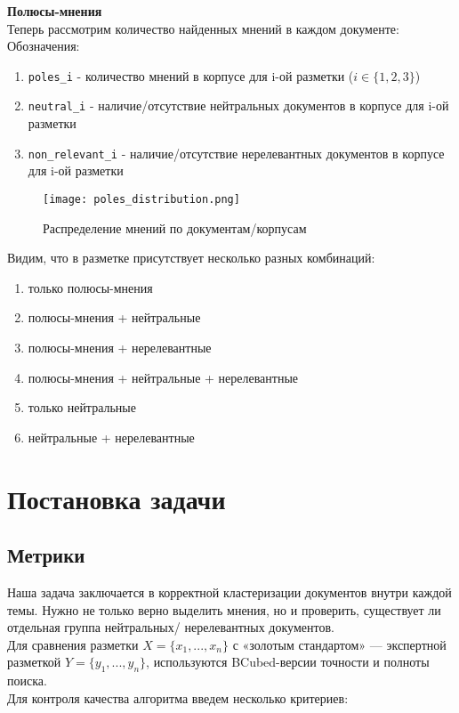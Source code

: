 \documentclass{article}
\begin{document}
\vspace{1cm}
\textbf{Полюсы-мнения}\\
Теперь рассмотрим количество найденных мнений в каждом документе: \\ Обозначения:
\begin{enumerate}
    \item \verb|poles_i| - количество мнений в корпусе для i-ой разметки ($i \in \{1,2,3\}$)
    \item \verb|neutral_i| - наличие/отсутствие нейтральных документов в корпусе для i-ой разметки
    \item \verb|non_relevant_i| - наличие/отсутствие нерелевантных документов в корпусе для i-ой разметки
\end{enumerate}
\newpage
\begin{figure}[!htb]
\center
    \texttt{[image: poles\_distribution.png]}
    \caption{Распределение мнений по документам/корпусам}
\end{figure}
Видим, что в разметке присутствует несколько разных комбинаций:
\begin{enumerate}
    \item только полюсы-мнения
    \item полюсы-мнения + нейтральные
    \item полюсы-мнения + нерелевантные
    \item полюсы-мнения + нейтральные + нерелевантные
    \item только нейтральные
    \item нейтральные + нерелевантные
\end{enumerate}

\section{Постановка задачи}
\subsection{Метрики}\label{metrics}
Наша задача заключается в корректной кластеризации документов внутри каждой темы. Нужно не только верно выделить мнения, но и проверить, существует ли отдельная группа нейтральных/ нерелевантных документов. \\
Для сравнения разметки $X=\{x_1,...,x_n\}$ с «золотым стандартом» — экспертной разметкой $Y=\{y_1,...,y_n\}$, используются BCubed-версии точности и полноты поиска.\\
Для контроля качества алгоритма введем несколько критериев:\\
\end{document}
